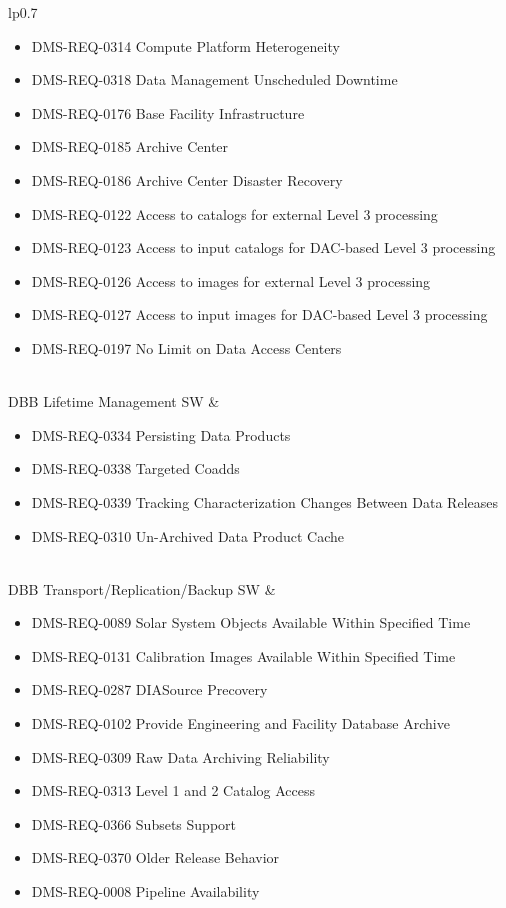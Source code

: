 \begin{xtabular}{lp{0.7\textwidth}}
\begin{itemize}
\item DMS-REQ-0314 Compute Platform Heterogeneity
\item DMS-REQ-0318 Data Management Unscheduled Downtime
\item DMS-REQ-0176 Base Facility Infrastructure
\item DMS-REQ-0185 Archive Center
\item DMS-REQ-0186 Archive Center Disaster Recovery
\item DMS-REQ-0122 Access to catalogs for external Level 3 processing
\item DMS-REQ-0123 Access to input catalogs for DAC-based Level 3 processing
\item DMS-REQ-0126 Access to images for external Level 3 processing
\item DMS-REQ-0127 Access to input images for DAC-based Level 3 processing
\item DMS-REQ-0197 No Limit on Data Access Centers
\end{itemize} \\ \hline
DBB Lifetime Management SW &
\begin{itemize}DMS-REQ-0346 Data Availability
\item DMS-REQ-0334 Persisting Data Products
\item DMS-REQ-0338 Targeted Coadds
\item DMS-REQ-0339 Tracking Characterization Changes Between Data Releases
\item DMS-REQ-0310 Un-Archived Data Product Cache
\end{itemize} \\ \hline
DBB Transport/Replication/Backup SW &
\begin{itemize}DMS-REQ-0344 Constraints on Level 1 Special Program Products Generation
\item DMS-REQ-0089 Solar System Objects Available Within Specified Time
\item DMS-REQ-0131 Calibration Images Available Within Specified Time
\item DMS-REQ-0287 DIASource Precovery
\item DMS-REQ-0102 Provide Engineering and Facility Database Archive
\item DMS-REQ-0309 Raw Data Archiving Reliability
\item DMS-REQ-0313 Level 1 and 2 Catalog Access
\item DMS-REQ-0366 Subsets Support
\item DMS-REQ-0370 Older Release Behavior
\item DMS-REQ-0008 Pipeline Availability

\end{itemize}
\end{xtabular}
